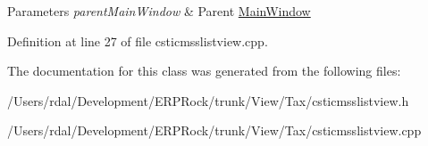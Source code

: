 \begin{DoxyParams}{\-Parameters}
{\em parent\-Main\-Window} & \-Parent \hyperlink{class_main_window}{\-Main\-Window} \\
\hline
\end{DoxyParams}


\-Definition at line 27 of file csticmsslistview.\-cpp.



\-The documentation for this class was generated from the following files\-:\begin{DoxyCompactItemize}
\item 
/\-Users/rdal/\-Development/\-E\-R\-P\-Rock/trunk/\-View/\-Tax/csticmsslistview.\-h\item 
/\-Users/rdal/\-Development/\-E\-R\-P\-Rock/trunk/\-View/\-Tax/csticmsslistview.\-cpp\end{DoxyCompactItemize}
